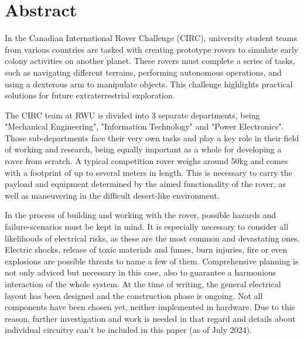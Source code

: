 \section{Abstract}

In the Canadian International Rover Challenge (CIRC), university student teams from various countries are tasked with creating prototype rovers to simulate early colony activities on another planet. These rovers must complete a series of tasks, such as navigating different terrains, performing autonomous operations, and using a dexterous arm to manipulate objects. This challenge highlights practical solutions for future extraterrestrial exploration.

\vspace{5mm} %

The CIRC team at RWU is divided into 3 separate departments, being "Mechanical Engineering", "Information Technology" and "Power Electronics". Those sub-departments face their very own tasks and play a key role in their field of working and research, being equally important as a whole for developing a rover from scratch. A typical competition rover weighs around 50kg and comes with a footprint of up to several meters in length. This is necessary to carry the payload and equipment determined by the aimed functionality of the rover, as well as maneuvering in the difficult desert-like environment. 

\vspace{5mm} %

In the process of building and working with the rover, possible hazards and failure-scenarios must be kept in mind. It is especially necessary to consider all likelihoods of electrical risks, as these are the most common and devastating ones. Electric shocks, release of toxic materials and fumes, burn injuries, fire or even explosions are possible threats to name a few of them. Comprehensive planning is not only adviced but necessary in this case, also to guarantee a harmonious interaction of the whole system. At the time of writing, the general electrical layout has been designed and the construction phase is ongoing. Not all components have been chosen yet, neither implemented in hardware. Due to this reason, further investigation and work is needed in that regard and details about individual circuitry can't be included in this paper (as of July 2024). 
